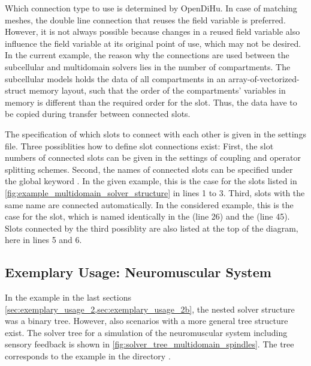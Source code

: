 Which connection type to use is determined by OpenDiHu. In case of matching meshes, the double line connection that reuses the field variable is preferred. However, it is not always possible because changes in a reused field variable also influence the field variable at its original point of use, which may not be desired. In the current example, the reason why the  connections are used between the subcellular and multidomain solvers lies in the number of compartments. The subcellular models holds the data of all compartments in an array-of-vectorized-struct memory layout, such that the order of the compartments' variables in memory is different than the required order for the slot. Thus, the data have to be copied during transfer between connected slots.

The specification of which slots to connect with each other is given in the settings file. Three possiblities how to define slot connections exist: First, the slot numbers of connected slots can be given in the settings of coupling and operator splitting schemes. Second, the names of connected slots can be specified under the global keyword . In the given example, this is the case for the slots listed in \cref{fig:example_multidomain_solver_structure} in lines 1 to 3. Third, slots with the same name are connected automatically. In the considered example, this is the case for the  slot, which is named identically in the  (line 26) and the  (line 45). Slots connected by the third possiblity are also listed at the top of the diagram, here in lines 5 and 6.


\subsection{Exemplary Usage: Neuromuscular System}\label{sec:exemplary_usage_3}

In the example in the last sections \cref{sec:exemplary_usage_2,sec:exemplary_usage_2b}, the nested solver structure was a binary tree. However, also scenarios with a more general tree structure exist. The solver tree for a simulation of the neuromuscular system including sensory feedback is shown in \cref{fig:solver_tree_multidomain_spindles}. The tree corresponds to the example in the directory .

